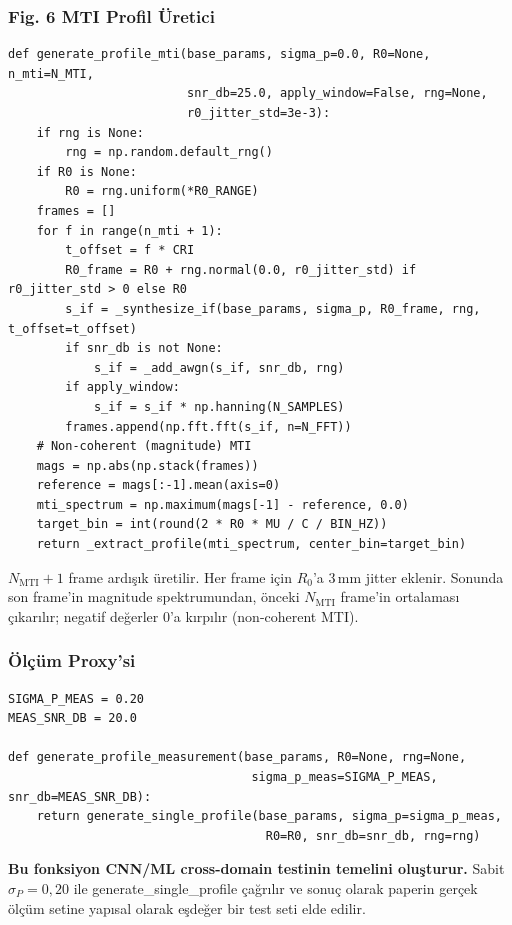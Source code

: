 \documentclass[11pt,a4paper]{article}
\begin{document}
\subsubsection{Fig. 6 MTI Profil Üretici}
\begin{lstlisting}[caption={Fig. 6 zinciri — non-coherent MTI + jitter}]
def generate_profile_mti(base_params, sigma_p=0.0, R0=None, n_mti=N_MTI,
                         snr_db=25.0, apply_window=False, rng=None,
                         r0_jitter_std=3e-3):
    if rng is None:
        rng = np.random.default_rng()
    if R0 is None:
        R0 = rng.uniform(*R0_RANGE)
    frames = []
    for f in range(n_mti + 1):
        t_offset = f * CRI
        R0_frame = R0 + rng.normal(0.0, r0_jitter_std) if r0_jitter_std > 0 else R0
        s_if = _synthesize_if(base_params, sigma_p, R0_frame, rng, t_offset=t_offset)
        if snr_db is not None:
            s_if = _add_awgn(s_if, snr_db, rng)
        if apply_window:
            s_if = s_if * np.hanning(N_SAMPLES)
        frames.append(np.fft.fft(s_if, n=N_FFT))
    # Non-coherent (magnitude) MTI
    mags = np.abs(np.stack(frames))
    reference = mags[:-1].mean(axis=0)
    mti_spectrum = np.maximum(mags[-1] - reference, 0.0)
    target_bin = int(round(2 * R0 * MU / C / BIN_HZ))
    return _extract_profile(mti_spectrum, center_bin=target_bin)
\end{lstlisting}
$N_{\text{MTI}}+1$ frame ardışık üretilir. Her frame için $R_0$'a 3\,mm jitter eklenir.
Sonunda son frame'in magnitude spektrumundan, önceki $N_{\text{MTI}}$ frame'in ortalaması
çıkarılır; negatif değerler 0'a kırpılır (non-coherent MTI).

\subsubsection{Ölçüm Proxy'si}
\begin{lstlisting}[caption={Sentetik ölçüm eşdeğeri (Fig. 11 davranışı)}]
SIGMA_P_MEAS = 0.20
MEAS_SNR_DB = 20.0

def generate_profile_measurement(base_params, R0=None, rng=None,
                                  sigma_p_meas=SIGMA_P_MEAS, snr_db=MEAS_SNR_DB):
    return generate_single_profile(base_params, sigma_p=sigma_p_meas,
                                    R0=R0, snr_db=snr_db, rng=rng)
\end{lstlisting}
\textbf{Bu fonksiyon CNN/ML cross-domain testinin temelini oluşturur.} Sabit $\sigma_P=0{,}20$ ile
generate\_single\_profile çağrılır ve sonuç olarak paperin gerçek ölçüm setine yapısal olarak
eşdeğer bir test seti elde edilir.
\end{document}
